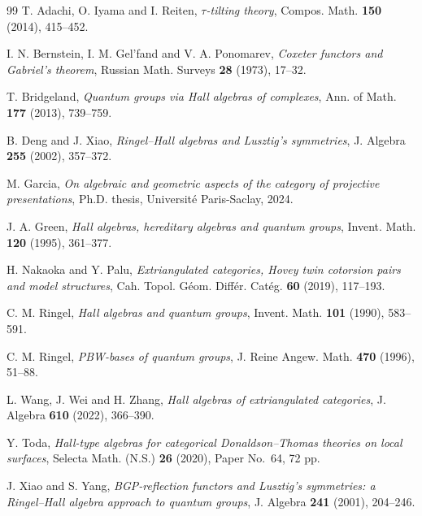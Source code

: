 \documentclass[12pt]{article}
\theoremstyle{plain}
\theoremstyle{remark}
\begin{document}
\begin{thebibliography}{99}
T. Adachi, O. Iyama and I. Reiten,
\textit{$\tau$-tilting theory},
Compos. Math. \textbf{150} (2014), 415--452.

I. N. Bernstein, I. M. Gel'fand and V. A. Ponomarev,
\textit{Coxeter functors and Gabriel's theorem},
Russian Math. Surveys \textbf{28} (1973), 17--32.

T. Bridgeland,
\textit{Quantum groups via Hall algebras of complexes},
Ann. of Math. \textbf{177} (2013), 739--759.

B. Deng and J. Xiao,
\textit{Ringel--Hall algebras and Lusztig's symmetries},
J. Algebra \textbf{255} (2002), 357--372.

M. Garcia,
\textit{On algebraic and geometric aspects of the category of projective presentations},
Ph.D. thesis, Universit\'e Paris-Saclay, 2024.

J. A. Green,
\textit{Hall algebras, hereditary algebras and quantum groups},
Invent. Math. \textbf{120} (1995), 361--377.

H. Nakaoka and Y. Palu,
\textit{Extriangulated categories, Hovey twin cotorsion pairs and model structures},
Cah. Topol. G\'eom. Diff\'er. Cat\'eg. \textbf{60} (2019), 117--193.

C. M. Ringel,
\textit{Hall algebras and quantum groups},
Invent. Math. \textbf{101} (1990), 583--591.

C. M. Ringel,
\textit{PBW-bases of quantum groups},
J. Reine Angew. Math. \textbf{470} (1996), 51--88.

L. Wang, J. Wei and H. Zhang,
\textit{Hall algebras of extriangulated categories},
J. Algebra \textbf{610} (2022), 366--390.

Y. Toda,
\textit{Hall-type algebras for categorical Donaldson--Thomas theories on local surfaces},
Selecta Math. (N.S.) \textbf{26} (2020), Paper No.~64, 72 pp.

J. Xiao and S. Yang,
\textit{BGP-reflection functors and Lusztig's symmetries: a Ringel--Hall algebra approach to quantum groups},
J. Algebra \textbf{241} (2001), 204--246.
\end{thebibliography}
\end{document}
